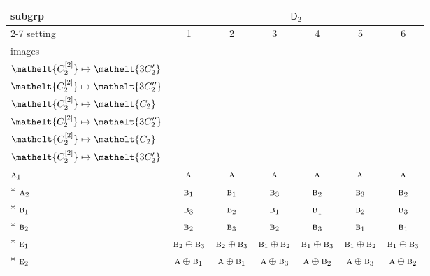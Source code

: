 \documentclass[10pt,a4paper]{article}
\numberwithin{equation}{section}
\newcommand{\eltfont}[1]{{\let\sigma\eltsigma\mathelt{#1}}}
\newcommand{\grp}[1]{\mathsf{#1}}
\newcommand{\irr}[1]{\text{\normalfont\scshape #1}}
\newcommand{\cls}[1]{\eltfont{#1}}
\newcommand{\genidx}[2]{#1^{[\mathrm{#2}]}}
\begin{document}
{\small\begin{longtable}{@{}lcccccc@{}}\toprule
subgrp & \multicolumn{6}{c}{\href{D2.pdf}{$\grp{D_{2}}$}}\\\cmidrule(lr){2-7}
setting & 1 & 2 & 3 & 4 & 5 & 6\\
images & {\scriptsize\begin{tabular}[t]{@{}c@{}}$\cls{\genidx{C_{2}}{1}} \mapsto \cls{C_{2}}$\\$\cls{\genidx{C_{2}}{2}} \mapsto \cls{3C_{2}'}$\end{tabular}} & {\scriptsize\begin{tabular}[t]{@{}c@{}}$\cls{\genidx{C_{2}}{1}} \mapsto \cls{C_{2}}$\\$\cls{\genidx{C_{2}}{2}} \mapsto \cls{3C_{2}''}$\end{tabular}} & {\scriptsize\begin{tabular}[t]{@{}c@{}}$\cls{\genidx{C_{2}}{1}} \mapsto \cls{3C_{2}'}$\\$\cls{\genidx{C_{2}}{2}} \mapsto \cls{C_{2}}$\end{tabular}} & {\scriptsize\begin{tabular}[t]{@{}c@{}}$\cls{\genidx{C_{2}}{1}} \mapsto \cls{3C_{2}'}$\\$\cls{\genidx{C_{2}}{2}} \mapsto \cls{3C_{2}''}$\end{tabular}} & {\scriptsize\begin{tabular}[t]{@{}c@{}}$\cls{\genidx{C_{2}}{1}} \mapsto \cls{3C_{2}''}$\\$\cls{\genidx{C_{2}}{2}} \mapsto \cls{C_{2}}$\end{tabular}} & {\scriptsize\begin{tabular}[t]{@{}c@{}}$\cls{\genidx{C_{2}}{1}} \mapsto \cls{3C_{2}''}$\\$\cls{\genidx{C_{2}}{2}} \mapsto \cls{3C_{2}'}$\end{tabular}}\\\midrule\endhead
\bottomrule\endfoot\endlastfoot
$\irr{a}_{1}$ & $\irr{a}$ & $\irr{a}$ & $\irr{a}$ & $\irr{a}$ & $\irr{a}$ & $\irr{a}$\\*
$\irr{a}_{2}$ & $\irr{b}_{1}$ & $\irr{b}_{1}$ & $\irr{b}_{3}$ & $\irr{b}_{2}$ & $\irr{b}_{3}$ & $\irr{b}_{2}$\\*
$\irr{b}_{1}$ & $\irr{b}_{3}$ & $\irr{b}_{2}$ & $\irr{b}_{1}$ & $\irr{b}_{1}$ & $\irr{b}_{2}$ & $\irr{b}_{3}$\\*
$\irr{b}_{2}$ & $\irr{b}_{2}$ & $\irr{b}_{3}$ & $\irr{b}_{2}$ & $\irr{b}_{3}$ & $\irr{b}_{1}$ & $\irr{b}_{1}$\\*
$\irr{e}_{1}$ & $\irr{b}_{2}\oplus \irr{b}_{3}$ & $\irr{b}_{2}\oplus \irr{b}_{3}$ & $\irr{b}_{1}\oplus \irr{b}_{2}$ & $\irr{b}_{1}\oplus \irr{b}_{3}$ & $\irr{b}_{1}\oplus \irr{b}_{2}$ & $\irr{b}_{1}\oplus \irr{b}_{3}$\\*
$\irr{e}_{2}$ & $\irr{a}\oplus \irr{b}_{1}$ & $\irr{a}\oplus \irr{b}_{1}$ & $\irr{a}\oplus \irr{b}_{3}$ & $\irr{a}\oplus \irr{b}_{2}$ & $\irr{a}\oplus \irr{b}_{3}$ & $\irr{a}\oplus \irr{b}_{2}$\\
\bottomrule\end{longtable}}
\end{document}
